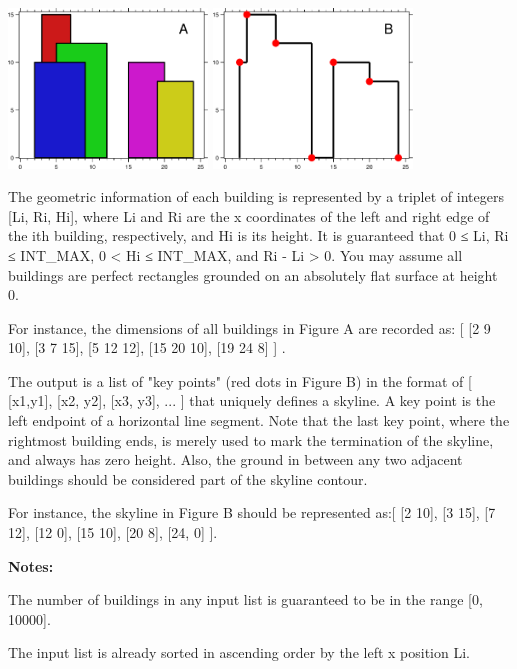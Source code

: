 \begin{center}
\includegraphics[width=150pt]{skyline1.png}
\includegraphics[width=150pt]{skyline2.png}
\end{center}

The geometric information of each building is represented by a triplet of integers [Li, Ri, Hi], where Li and Ri are the x coordinates of the left and right edge of the ith building, respectively, and Hi is its height. It is guaranteed that 0 ≤ Li, Ri ≤ INT_MAX, 0 < Hi ≤ INT_MAX, and Ri - Li > 0. You may assume all buildings are perfect rectangles grounded on an absolutely flat surface at height 0.

For instance, the dimensions of all buildings in Figure A are recorded as: [ [2 9 10], [3 7 15], [5 12 12], [15 20 10], [19 24 8] ] .

The output is a list of "key points" (red dots in Figure B) in the format of [ [x1,y1], [x2, y2], [x3, y3], ... ] that uniquely defines a skyline. A key point is the left endpoint of a horizontal line segment. Note that the last key point, where the rightmost building ends, is merely used to mark the termination of the skyline, and always has zero height. Also, the ground in between any two adjacent buildings should be considered part of the skyline contour.

For instance, the skyline in Figure B should be represented as:[ [2 10], [3 15], [7 12], [12 0], [15 10], [20 8], [24, 0] ].

\textbf{Notes:}

The number of buildings in any input list is guaranteed to be in the range [0, 10000].

The input list is already sorted in ascending order by the left x position Li.

